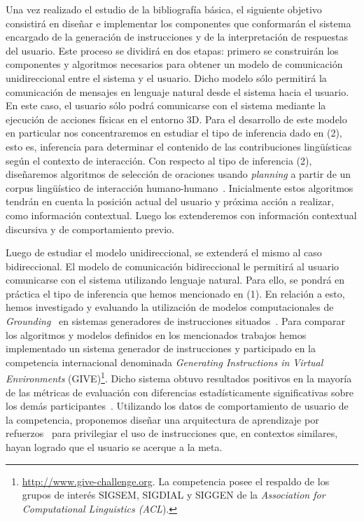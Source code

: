 \documentclass[10.9pt,a4paper]{article}
\begin{document}
Una vez realizado el estudio de la bibliograf\'ia b\'asica, el siguiente 
objetivo consistir\'a en dise\~nar e implementar los componentes que 
conformar\'an el sistema encargado de la generaci\'on de instrucciones y 
de la interpretaci\'on de respuestas del usuario.
Este proceso se dividir\'a en dos etapas: primero se construir\'an los 
componentes y algoritmos necesarios para obtener un modelo de 
comunicaci\'on unidireccional entre el sistema y el usuario. Dicho modelo 
s\'olo permitir\'a la comunicaci\'on de mensajes en lenguaje 
natural desde el sistema hacia el usuario. En este caso, el usuario s\'olo 
podr\'a comunicarse con el sistema mediante la ejecuci\'on de 
acciones f\'isicas en el entorno 3D. Para el desarrollo de este modelo en 
particular nos concentraremos en estudiar el tipo de inferencia dado 
en (2), esto es, inferencia para determinar el contenido de las 
contribuciones ling\"u\'isticas seg\'un el contexto de interacci\'on.
Con respecto al tipo de inferencia (2), dise\~naremos algoritmos de
selecci\'on de oraciones usando \emph{planning} a partir de un corpus 
ling\"u\'istico de interacci\'on humano-humano~\citep{beno:acl11,beno:hci12}.
Inicialmente estos algoritmos tendr\'an en cuenta la posici\'on actual del 
usuario y pr\'oxima acci\'on a realizar, como informaci\'on contextual. 
Luego los extenderemos con informaci\'on contextual discursiva y de 
comportamiento previo.

Luego de estudiar el modelo unidireccional, se extender\'a
el mismo al caso bidireccional. 
El modelo de comunicaci\'on bidireccional le permitir\'a al usuario 
comunicarse con el sistema utilizando lenguaje natural.
Para ello, se pondr\'a en pr\'actica el tipo de inferencia que hemos mencionado
en (1). En relaci\'on a esto, hemos investigado y evaluando la 
utilizaci\'on de modelos computacionales de 
\emph{Grounding}~\citep{traum99} en sistemas generadores de 
instrucciones situados~\citep{racc:ENLG11,raccathesis}. Para 
comparar los algoritmos y modelos definidos en los mencionados trabajos 
hemos implementado un sistema generador de instrucciones y participado en 
la competencia internacional denominada \emph{Generating Instructions 
in Virtual Environments} 
(GIVE)\footnote{\url{http://www.give-challenge.org}. La competencia 
posee el respaldo de los grupos de inter\'es SIGSEM, SIGDIAL y SIGGEN de 
la \emph{Association for Computational Linguistics 
(ACL}).}.
Dicho sistema obtuvo resultados positivos en la mayor\'ia de las 
m\'etricas de evaluaci\'on con diferencias estad\'isticamente significativas 
sobre los dem\'as participantes~\citep{stri:ENLG11}.
Utilizando los datos de comportamiento de usuario de la competencia,
proponemos dise\~nar una arquitectura de aprendizaje por
refuerzos~\citep{sutton98} para privilegiar el uso de instrucciones
que, en contextos similares, hayan logrado que el usuario se acerque a
la meta.
\end{document}
